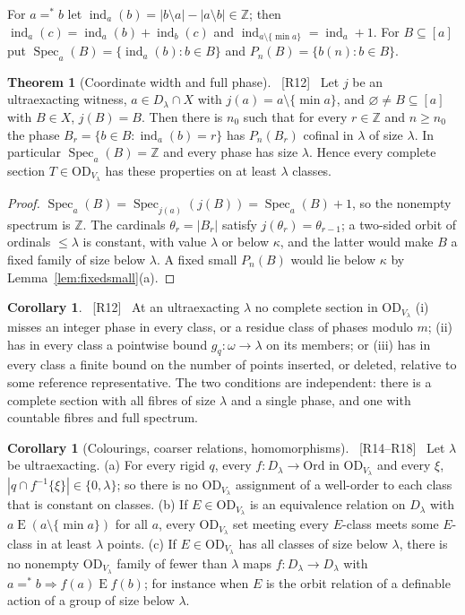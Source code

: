 \documentclass[11pt,letterpaper]{article}
\theoremstyle{definition}
\newtheorem{theorem}[definition]{Theorem}
\newtheorem{corollary}[definition]{Corollary}
\numberwithin{equation}{section}
\newcommand{\OD}{\mathrm{OD}}
\newcommand{\Spec}{\operatorname{Spec}}
\newcommand{\ch}{\operatorname{ind}}
\newcommand{\src}[1]{\unskip\ {\normalfont\small\sffamily\color{Olive}[#1]}\ }
\begin{document}
For $a=^*b$ let $\ch_a(b)=|b\setminus a|-|a\setminus b|\in\mathbb Z$; then $\ch_a(c)=\ch_a(b)+\ch_b(c)$ and $\ch_{a\setminus\{\min a\}}=\ch_a+1$. For $B\subseteq[a]$ put $\Spec_a(B)=\{\ch_a(b):b\in B\}$ and $P_n(B)=\{b(n):b\in B\}$.

\begin{theorem}[Coordinate width and full phase]\label{thm:phase}\src{R12}
Let $j$ be an ultraexacting witness, $a\in D_\lambda\cap X$ with $j(a)=a\setminus\{\min a\}$, and $\varnothing\ne B\subseteq[a]$ with $B\in X$, $j(B)=B$. Then there is $n_0$ such that for every $r\in\mathbb Z$ and $n\ge n_0$ the phase $B_r=\{b\in B:\ch_a(b)=r\}$ has $P_n(B_r)$ cofinal in $\lambda$ of size $\lambda$. In particular $\Spec_a(B)=\mathbb Z$ and every phase has size $\lambda$. Hence every complete section $T\in\OD_{V_\lambda}$ has these properties on at least $\lambda$ classes.
\end{theorem}

\begin{proof}
$\Spec_a(B)=\Spec_{j(a)}(j(B))=\Spec_a(B)+1$, so the nonempty spectrum is $\mathbb Z$. The cardinals $\theta_r=|B_r|$ satisfy $j(\theta_r)=\theta_{r-1}$; a two-sided orbit of ordinals $\le\lambda$ is constant, with value $\lambda$ or below $\kappa$, and the latter would make $B$ a fixed family of size below $\lambda$. A fixed small $P_n(B)$ would lie below $\kappa$ by Lemma~\ref{lem:fixedsmall}(a).
\end{proof}

\begin{corollary}\label{cor:phasecons}\src{R12}
At an ultraexacting $\lambda$ no complete section in $\OD_{V_\lambda}$ (i) misses an integer phase in every class, or a residue class of phases modulo $m$; (ii) has in every class a pointwise bound $g_q:\omega\to\lambda$ on its members; or (iii) has in every class a finite bound on the number of points inserted, or deleted, relative to some reference representative. The two conditions are independent: there is a complete section with all fibres of size $\lambda$ and a single phase, and one with countable fibres and full spectrum.
\end{corollary}

\begin{corollary}[Colourings, coarser relations, homomorphisms]\label{cor:colour}\src{R14--R18}
Let $\lambda$ be ultraexacting.
(a) For every rigid $q$, every $f:D_\lambda\to\mathrm{Ord}$ in $\OD_{V_\lambda}$ and every $\xi$, $|q\cap f^{-1}\{\xi\}|\in\{0,\lambda\}$; so there is no $\OD_{V_\lambda}$ assignment of a well-order to each class that is constant on classes.
(b) If $E\in\OD_{V_\lambda}$ is an equivalence relation on $D_\lambda$ with $a\mathrel E(a\setminus\{\min a\})$ for all $a$, every $\OD_{V_\lambda}$ set meeting every $E$-class meets some $E$-class in at least $\lambda$ points.
(c) If $E\in\OD_{V_\lambda}$ has all classes of size below $\lambda$, there is no nonempty $\OD_{V_\lambda}$ family of fewer than $\lambda$ maps $f:D_\lambda\to D_\lambda$ with $a=^*b\Rightarrow f(a)\mathrel E f(b)$; for instance when $E$ is the orbit relation of a definable action of a group of size below $\lambda$.
\end{corollary}
\end{document}
